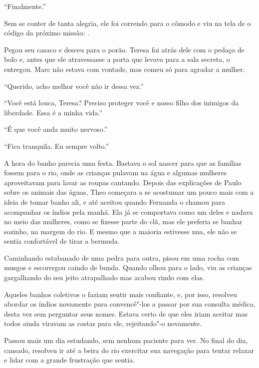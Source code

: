 ``Finalmente.''

Sem se conter de tanta alegria, ele foi correndo para o cômodo e viu na
tela de  o código da próximo missão: .

Pegou seu casaco e desceu para o porão. Teresa foi atrás dele com o
pedaço de bolo e, antes que ele atravessasse a porta que levava para a
sala secreta, o entregou. Marc não estava com vontade, mas comeu só para
agradar a mulher.

``Querido, acho melhor você não ir dessa vez.''

``Você está louca, Teresa? Preciso proteger você e nosso filho dos
inimigos da liberdade. Essa é a minha vida.''

``É que você anda muito nervoso.''

``Fica tranquila. Eu sempre volto.''

\asterisc


A hora do banho parecia uma festa. Bastava o sol nascer para que as
famílias fossem para o rio, onde as crianças pulavam na água e algumas
mulheres aproveitavam para lavar as roupas cantando. Depois das
explicações de Paulo sobre os animais das águas, Theo começara a se
acostumar um pouco mais com a ideia de tomar banho ali, e até aceitou
quando Fernanda o chamou para acompanhar os índios pela manhã. Ela já se
comportava como um deles e nadava no meio das mulheres, como se fizesse
parte do clã, mas ele preferia se banhar sozinho, na margem do rio. E
mesmo que a maioria estivesse nua, ele não se sentia confortável de tirar
a bermuda.

Caminhando estabanado de uma pedra para outra, pisou em uma rocha com
musgos e escorregou caindo de bunda. Quando olhou para o lado, viu as
crianças gargalhando do seu jeito atrapalhado mas acabou rindo com elas.

Aqueles banhos coletivos o faziam sentir mais confiante, e, por isso,
resolveu abordar os índios novamente para convencê"-los a passar por sua
consulta médica, desta vez sem perguntar seus nomes. Estava certo de que
eles iriam aceitar mas todos ainda viravam as costas para ele,
rejeitando"-o novamente.

Passou mais um dia estudando, sem nenhum paciente para ver. No final do
dia, cansado, resolveu ir até a beira do rio exercitar sua navegação
para tentar relaxar e lidar com a grande frustração que sentia.


